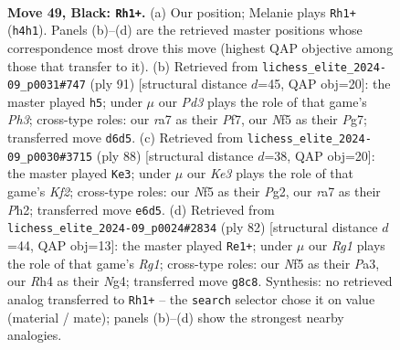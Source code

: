 \documentclass[11pt]{article}
\begin{document}
\clearpage

\begin{figure}[p]\centering
\begin{subfigure}{0.46\textwidth}\centering
\resizebox{\linewidth}{!}{%
\newchessgame
\chessboard[
  setfen={6r1/R7/3pk1p1/5n1p/7r/1p6/1R2N1P1/5K2 b - - 5 49},
  showmover=false,
  pgfstyle=straightmove, color=movearrow, markmove={h4-h1}
]}
\caption{}
\end{subfigure}\hfill
\begin{subfigure}{0.46\textwidth}\centering
\resizebox{\linewidth}{!}{%
\newchessgame
\chessboard[
  setfen={R7/p4ppk/4n2p/8/1B5r/P3P3/8/5NK1 b - - 3 46},
  showmover=false,
  pgfstyle=straightmove, color=movearrow, markmove={h6-h5}
]}
\caption{}
\end{subfigure}
\\[4pt]
\begin{subfigure}{0.46\textwidth}\centering
\resizebox{\linewidth}{!}{%
\newchessgame
\chessboard[
  setfen={r3n3/P2k3p/6p1/1N2p3/4P3/5P2/2R2KPP/8 w - - 3 45},
  showmover=false,
  pgfstyle=straightmove, color=movearrow, markmove={f2-e3}
]}
\caption{}
\end{subfigure}\hfill
\begin{subfigure}{0.46\textwidth}\centering
\resizebox{\linewidth}{!}{%
\newchessgame
\chessboard[
  setfen={8/3n4/4k3/p7/6N1/PP1r4/KP6/6R1 w - - 6 42},
  showmover=false,
  pgfstyle=straightmove, color=movearrow, markmove={g1-e1}
]}
\caption{}
\end{subfigure}
\caption{\textbf{Move 49, Black: \texttt{Rh1+}.} (a) Our position; Melanie plays \texttt{Rh1+} (\texttt{h4h1}). Panels (b)--(d) are the retrieved master positions whose correspondence most drove this move (highest QAP objective among those that transfer to it). (b) Retrieved from \texttt{lichess\_elite\_2024-09\_p0031\#747} (ply 91) [structural distance $d$=45, QAP obj=20]: the master played \texttt{h5}; under $\mu$ our \emph{Pd3} plays the role of that game's \emph{Ph3}; cross-type roles: our \emph{r}a7 as their \emph{P}f7, our \emph{N}f5 as their \emph{P}g7; transferred move \texttt{d6d5}. (c) Retrieved from \texttt{lichess\_elite\_2024-09\_p0030\#3715} (ply 88) [structural distance $d$=38, QAP obj=20]: the master played \texttt{Ke3}; under $\mu$ our \emph{Ke3} plays the role of that game's \emph{Kf2}; cross-type roles: our \emph{N}f5 as their \emph{P}g2, our \emph{r}a7 as their \emph{P}h2; transferred move \texttt{e6d5}. (d) Retrieved from \texttt{lichess\_elite\_2024-09\_p0024\#2834} (ply 82) [structural distance $d$=44, QAP obj=13]: the master played \texttt{Re1+}; under $\mu$ our \emph{Rg1} plays the role of that game's \emph{Rg1}; cross-type roles: our \emph{N}f5 as their \emph{P}a3, our \emph{R}h4 as their \emph{N}g4; transferred move \texttt{g8c8}. Synthesis: no retrieved analog transferred to \texttt{Rh1+} -- the \texttt{search} selector chose it on value (material / mate); panels (b)--(d) show the strongest nearby analogies.}
\label{fig:thought-m97}
\end{figure}
\end{document}
